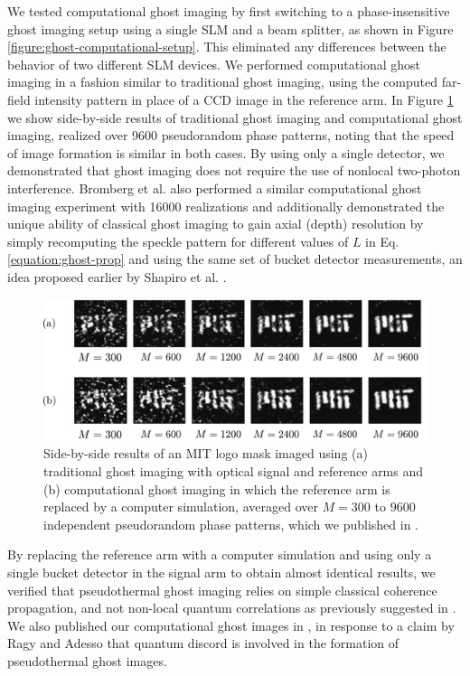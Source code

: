 We tested computational ghost imaging by first switching to a phase-insensitive ghost imaging setup using a single SLM and a beam splitter, as shown in Figure \ref{figure:ghost-computational-setup}. This eliminated any differences between the behavior of two different SLM devices. We performed computational ghost imaging in a fashion similar to traditional ghost imaging, using the computed far-field intensity pattern in place of a CCD image in the reference arm. In Figure \ref{figure:ghost-computational-result} we show side-by-side results of traditional ghost imaging and computational ghost imaging, realized over 9600 pseudorandom phase patterns, noting that the speed of image formation is similar in both cases. By using only a single detector, we demonstrated that ghost imaging does not require the use of nonlocal two-photon interference. Bromberg et al. \cite{bromberg-ghost} also performed a similar computational ghost imaging experiment with 16000 realizations and additionally demonstrated the unique ability of classical ghost imaging to gain axial (depth) resolution by simply recomputing the speckle pattern for different values of $L$ in Eq. \ref{equation:ghost-prop} and using the same set of bucket detector measurements, an idea proposed earlier by Shapiro et al. \cite{shapiro-computational}.

\begin{figure}[t]
\begin{center}
\includegraphics[width=16cm]{figure-ghost-computational-result.pdf}
\caption{Side-by-side results of an MIT logo mask imaged using (a) traditional ghost imaging with optical signal and reference arms and (b) computational ghost imaging in which the reference arm is replaced by a computer simulation, averaged over $M = 300$ to $9600$ independent pseudorandom phase patterns, which we published in \cite{shapiro-discord}.}
\label{figure:ghost-computational-result}
\end{center}
\end{figure}

By replacing the reference arm with a computer simulation and using only a single bucket detector in the signal arm to obtain almost identical results, we verified that pseudothermal ghost imaging relies on simple classical coherence propagation, and not non-local quantum correlations as previously suggested in \cite{scarcelli-can}. We also published our computational ghost images in \cite{shapiro-discord}, in response to a claim by Ragy and Adesso \cite{ragy-nature} that quantum discord is involved in the formation of pseudothermal ghost images.

